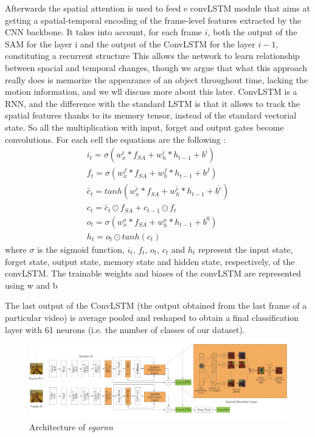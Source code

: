 \documentclass[10pt,twocolumn,hidelinks,letterpaper]{article}
\begin{document}
Afterwards the spatial attention is used to feed e convLSTM module that aims at getting a spatial-temporal encoding of the frame-level features extracted by the CNN backbone. It takes into account, for each frame $i$, both the output of the SAM for the layer i and the output of the ConvLSTM for the layer $i-1$, constituting a recurrent structure
This allows the network to learn relationship between spacial and temporal changes, though we argue that what this approach really does is memorize the appearance of an object throughout time, lacking the motion information, and we wll discuss more about this later. ConvLSTM is a RNN, and the difference with the standard LSTM is that it allows to track the spatial features thanks to its memory tensor, instead of the standard vectorial state. So all the multiplication with input, forget and output gates become convolutions. For each cell the equations are the following :
\begin{align*}
i_t = \sigma(w_x^i * f_{SA} + w_h^i * h_{t-1} + b^i)\\
f_t = \sigma(w_x^f * f_{SA} + w_h^f * h_{t-1} + b^f)\\
\tilde{c_t} = tanh(w_x^{\tilde{c}}*f_{SA}+w_h^{\tilde{c}}*h_{t-1} + b^{\tilde{c}})\\
c_t = \tilde{c_t} \odot f_{SA} + c_{t-1} \odot f_{t}\\
o_t = \sigma(w_x^o * f_{SA} + w_h^o * h_{t-1} + b^0)\\
h_t = o_t \odot tanh(c_t)
\end{align*}
where $\sigma$ is the sigmoid function, $i_t$, $f_t$, $o_t$, $c_t$ and $h_t$ represent the input state, forget state,
output state, memory state and hidden state, respectively, of the convLSTM. The trainable
weights and biases of the convLSTM are represented using w and b


The last output of the ConvLSTM (the output obtained from the last frame of a particular video) is average pooled and reshaped to obtain a final classification layer with 61 neurons (i.e. the number of classes of our dataset).

\begin{figure}
  \centering
  \includegraphics[width=\linewidth]{images/egornn.png}
  \caption{Architecture of \textit{egornn}}
  \label{egornn_arch}
\end{figure}
\end{document}
